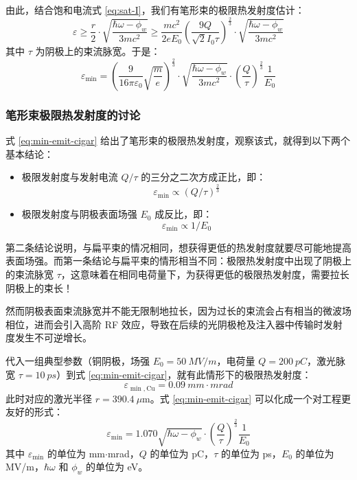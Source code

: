 由此，结合饱和电流式 \ref{eq:sat-I}，我们有笔形束的极限热发射度估计：
\begin{equation}
\varepsilon \ge \frac{r}{2}\cdot\sqrt{\frac{\hbar\omega-\phi_w}{3mc^2}} \ge \frac{mc^2}{2eE_0}\left(\frac{9Q}{\sqrt{2}I_0\tau}\right)^{\frac{2}{3}}\cdot\sqrt{\frac{\hbar\omega-\phi_w}{3mc^2}}
\end{equation}
其中 $\tau$ 为阴极上的束流脉宽。于是：
\begin{equation}
\varepsilon_{\min} = \left(\frac{9}{16\pi\varepsilon_0}\sqrt{\frac{m}{e}}\right)^{\frac{2}{3}}\cdot\sqrt{\frac{\hbar\omega-\phi_w}{3mc^2}}\cdot\left(\frac{Q}{\tau}\right)^{\frac{2}{3}}\frac{1}{E_0}
\label{eq:min-emit-cigar}
\end{equation}

\subsubsection{笔形束极限热发射度的讨论}
式 \ref{eq:min-emit-cigar} 给出了笔形束的极限热发射度，观察该式，就得到以下两个基本结论：
\begin{itemize}
\item 极限发射度与发射电流 $Q/\tau$ 的三分之二次方成正比，即：
\begin{equation}
\varepsilon_{\min} \propto (Q/\tau)^{\frac{2}{3}}
\end{equation}
\item 极限发射度与阴极表面场强 $E_0$ 成反比，即：
\begin{equation}
\varepsilon_{\min} \propto 1/E_0
\end{equation}
\end{itemize}
第二条结论说明，与扁平束的情况相同，想获得更低的热发射度就要尽可能地提高表面场强。而第一条结论与扁平束的情形相当不同：极限热发射度中出现了阴极上的束流脉宽 $\tau$，这意味着在相同电荷量下，为获得更低的极限热发射度，需要拉长阴极上的束长！

然而阴极表面束流脉宽并不能无限制地拉长，因为过长的束流会占有相当的微波场相位，进而会引入高阶 RF 效应，导致在后续的光阴极枪及注入器中传输时发射度发生不可逆增长。

代入一组典型参数（铜阴极，场强 $E_0=\SI{50}{MV/m}$，电荷量 $Q=\SI{200}{pC}$，激光脉宽 $\tau=\SI{10}{ps}$）到式 \ref{eq:min-emit-cigar}，就有此情形下的极限热发射度：
\begin{equation}
\varepsilon_{\min, \text{Cu}} = \SI{0.09}{mm\cdot mrad}
\end{equation}
此时对应的激光半径 $r=\SI{390.4}{\mu\meter}$。式 \ref{eq:min-emit-cigar} 可以化成一个对工程更友好的形式：
\begin{equation}
\varepsilon_{\min} = 1.070\sqrt{\hbar\omega-\phi_w}\cdot\left(\frac{Q}{\tau}\right)^{\frac{2}{3}}\frac{1}{E_0}
\label{eq:min-emit-cigar-eig}
\end{equation}
其中 $\varepsilon_{\min}$ 的单位为 mm$\cdot$mrad，$Q$ 的单位为 pC，$\tau$ 的单位为 ps，$E_0$ 的单位为 MV/m，$\hbar\omega$ 和 $\phi_w$ 的单位为 eV。

